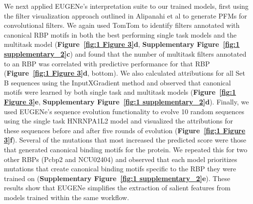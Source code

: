 We next applied EUGENe’s interpretation suite to our trained models, first using the filter visualization approach outlined in Alipanahi et al to generate PFMs for convolutional filters. We again used TomTom to identify filters annotated with canonical RBP motifs\cite{Ray2013-yd} in both the best performing single task models and the multitask model (\textbf{Figure~\ref{fig:1 Figure 3}d}, \textbf{Supplementary Figure~\ref{fig:1 supplementary_2}c}) and found that the number of multitask filters annotated to an RBP was correlated with predictive performance for that RBP (\textbf{Figure~\ref{fig:1 Figure 3}d}, bottom). We also calculated attributions for all Set B sequences using the InputXGradient method\cite{Shrikumar2016-lf} and observed that canonical motifs were learned by both single task and multitask models (\textbf{Figure~\ref{fig:1 Figure 3}e}, \textbf{Supplementary Figure~\ref{fig:1 supplementary_2}d}). Finally, we used EUGENe’s sequence evolution functionality to evolve 10 random sequences using the single task HNRNPA1L2 model and visualized the attributions for these sequences before and after five rounds of evolution (\textbf{Figure~\ref{fig:1 Figure 3}f}). Several of the mutations that most increased the predicted score were those that generated canonical binding motifs for the protein. We repeated this for two other RBPs (Pcbp2 and NCU02404) and observed that each model prioritizes mutations that create canonical binding motifs specific to the RBP they were trained on (\textbf{Supplementary Figure~\ref{fig:1 supplementary_2}e}). These results show that EUGENe simplifies the extraction of salient features from models trained within the same workflow.

\clearpage

